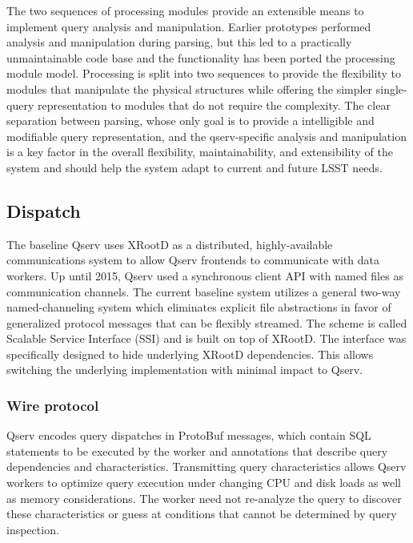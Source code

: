 \documentclass[DM,lsstdraft,toc]{lsstdoc}
\begin{document}
The two sequences of processing modules provide an extensible means to
implement query analysis and manipulation. Earlier prototypes performed
analysis and manipulation during parsing, but this led to a practically
unmaintainable code base and the functionality has been ported the
processing module model. Processing is split into two sequences to
provide the flexibility to modules that manipulate the physical
structures while offering the simpler single-query representation to
modules that do not require the complexity. The clear separation between
parsing, whose only goal is to provide a intelligible and modifiable
query representation, and the qserv-specific analysis and manipulation
is a key factor in the overall flexibility, maintainability, and
extensibility of the system and should help the system adapt to current
and future LSST needs.

\subsection{Dispatch}\label{dispatch}

The baseline Qserv uses XRootD as a
distributed, highly-available communications system to allow Qserv
frontends to communicate with data workers. Up until 2015, Qserv used a
synchronous client API with named files as communication channels. The
current baseline system utilizes a general two-way named-channeling
system which eliminates explicit file abstractions in favor of
generalized protocol messages that can be flexibly streamed. The scheme
is called Scalable Service Interface (SSI) and is built on top
of XRootD. The interface was specifically
designed to hide underlying XRootD
dependencies. This allows switching the underlying implementation with
minimal impact to Qserv.

\subsubsection{Wire protocol}\label{wire-protocol}

Qserv encodes query dispatches in ProtoBuf messages, which contain SQL
statements to be executed by the worker and annotations that describe
query dependencies and characteristics. Transmitting query
characteristics allows Qserv workers to optimize query execution under
changing CPU and disk loads as well as memory considerations. The worker
need not re-analyze the query to discover these characteristics or guess
at conditions that cannot be determined by query inspection.
\end{document}
